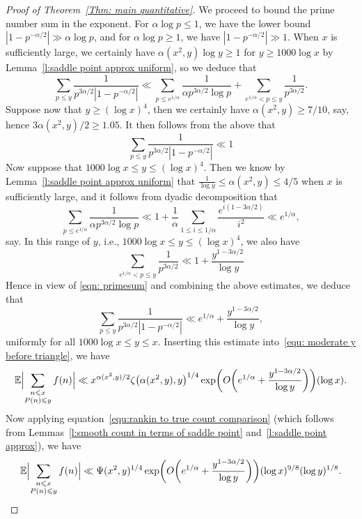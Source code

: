 \documentclass[12pt,a4paper,reqno]{amsart}
\numberwithin{equation}{section}
\def\E{\mathbb E}
\def\leq {\leqslant}
\theoremstyle{remark}
\theoremstyle{definition}
\numberwithin{equation}{section}
\theoremstyle{remark}
\def\E{\mathbb E}
\begin{document}
\begin{proof}[Proof of Theorem~\ref{Thm: main quantitative}]
We proceed to bound the prime number sum in the exponent. For $\alpha \log p \leq 1$, we have the lower bound $|1 - p^{-\alpha / 2}| \gg \alpha \log p$, and for $\alpha \log p \geq 1$, we have $|1 - p^{-\alpha / 2}| \gg 1$. When $x$ is sufficiently large, we certainly have $\alpha (x^2, y) \log y \geq 1$ for $y \geq 1000 \log x$ by Lemma~\ref{l:saddle point approx uniform}, so we deduce that
\begin{equation}\label{eqn: primesum}
\sum_{p \leq y} \frac{1}{p^{3 \alpha / 2} |1 - p^{-\alpha / 2}|} \ll \sum_{p \leq e^{1/\alpha}} \frac{1}{\alpha p^{3 \alpha / 2} \log p} + \sum_{e^{1 / \alpha} < p \leq y} \frac{1}{p^{3 \alpha / 2}} . 
\end{equation}
Suppose now that $y \geq (\log x)^{4}$, then we certainly have $\alpha (x^2, y) \geq 7/10$, say, hence $3 \alpha (x^2, y) / 2 \geq 1.05$. It then follows from the above that
\[
\sum_{p \leq y} \frac{1}{p^{3 \alpha / 2} |1 - p^{-\alpha / 2}|} \ll 1
\]
Now suppose that $1000 \log x \leq y \leq (\log x)^4$. Then we know by Lemma~\ref{l:saddle point approx uniform} that $\frac{1}{\log y} \leq \alpha (x^2, y) \leq 4/5$ when $x$ is sufficiently large, and it follows from dyadic decomposition that
\[
\sum_{p \leq e^{1/\alpha}} \frac{1}{\alpha p^{3 \alpha / 2} \log p} \ll 1 + \frac{1}{\alpha} \sum_{1 \leq i \leq 1/\alpha} \frac{e^{i(1 - 3 \alpha / 2)}}{i^2} \ll e^{1/\alpha}  ,
\]
say. In this range of $y$, i.e., $1000 \log x \leq y \leq (\log x)^4$, we also have
\[
\sum_{e^{1 / \alpha} < p \leq y} \frac{1}{p^{3 \alpha / 2}} \ll 1 + \frac{y^{1 - 3 \alpha / 2}}{\log y} \]
 Hence in view of \eqref{eqn: primesum} and combining the above estimates, we deduce that
\[
\sum_{p \leq y} \frac{1}{p^{3 \alpha / 2} |1 - p^{-\alpha / 2}|} \ll e^{1/\alpha} + \frac{y^{1 - 3 \alpha / 2}}{\log y} ,
\]
uniformly for all $1000 \log x \leq y \leq x$. Inserting this estimate into~\eqref{equ: moderate y before triangle}, we have
\[
\E \Bigl| \sum_{\substack{n \leq x \\ P(n) \leq y}} f(n) \Bigr| \ll x^{\alpha (x^2, y) / 2} \zeta \bigl( \alpha (x^2, y), y \bigr)^{1/4} \exp \biggl( O \biggl( e^{1/\alpha} + \frac{y^{1 - 3 \alpha / 2}}{\log y} \biggr) \biggr) (\log x) .
\]
Now applying equation~\eqref{equ:rankin to true count comparison} (which follows from Lemmas~\ref{l:smooth count in terms of saddle point} and~\ref{l:saddle point approx}), we have
\begin{equation}\label{equ: quant bound in terms of Psi (x^2, y)}
\E \Bigl| \sum_{\substack{n \leq x \\ P(n) \leq y}} f(n) \Bigr| \ll \Psi(x^2, y)^{1/4} \exp \biggl( O \biggl( e^{1/\alpha} + \frac{y^{1 - 3 \alpha / 2}}{\log y} \biggr) \biggr) (\log x)^{9/8} (\log y)^{1/8}.

\end{equation}
\end{proof}
\end{document}
